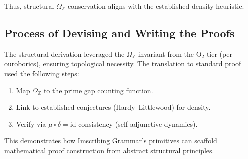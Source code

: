 \documentclass[12pt,a4paper]{article}
\begin{document}
Thus, structural $\Omega_{\mathbb{Z}}$ conservation aligns with the established density heuristic.

\subsection{Process of Devising and Writing the Proofs}

The structural derivation leveraged the $\Omega_{\mathbb{Z}}$ invariant from the $\mathrm{O}_2$ tier (per ouroborics), ensuring topological necessity. The translation to standard proof used the following steps:

\begin{enumerate}
    \item Map $\Omega_{\mathbb{Z}}$ to the prime gap counting function.
    \item Link to established conjectures (Hardy--Littlewood) for density.
    \item Verify via $\mu \circ \delta = \text{id}$ consistency (self-adjunctive dynamics).
\end{enumerate}

This demonstrates how Imscribing Grammar's primitives can scaffold mathematical proof construction from abstract structural principles.
\end{document}
